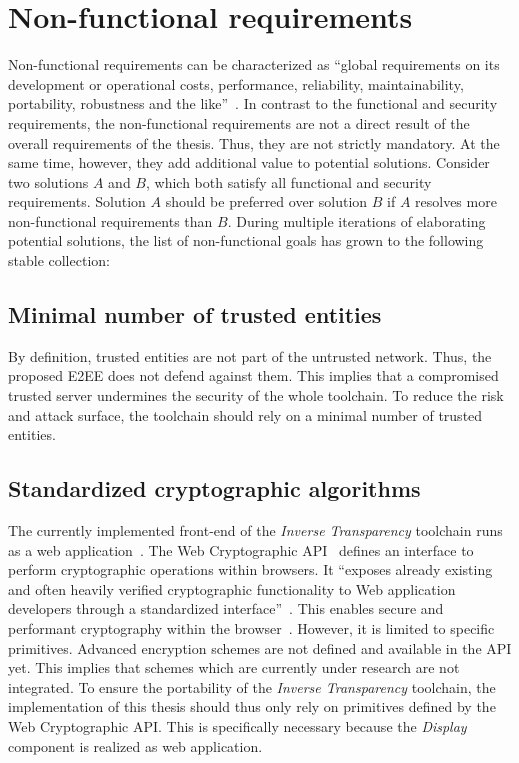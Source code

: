 \documentclass[../main.tex]{subfiles}
\begin{document}
\section{Non-functional requirements}\label{non-functional-requriements}
Non-functional requirements can be characterized as \enquote{global requirements on its development or operational costs, performance, reliability, maintainability, portability, robustness and the like}~\cite[11]{Mylopoulos1992}.
In contrast to the functional and security requirements, the non-functional requirements are not a direct result of the overall requirements of the thesis.
Thus, they are not strictly mandatory.
At the same time, however, they add additional value to potential solutions.
Consider two solutions $A$ and $B$, which both satisfy all functional and security requirements.
Solution $A$ should be preferred over solution $B$ if $A$ resolves more non-functional requirements than $B$.
During multiple iterations of elaborating potential solutions, the list of non-functional goals has grown to the following stable collection:

\subsection{Minimal number of trusted entities}
By definition, trusted entities are not part of the untrusted network. 
Thus, the proposed E2EE does not defend against them.
This implies that a compromised trusted server undermines the security of the whole toolchain.
To reduce the risk and attack surface, the toolchain should rely on a minimal number of trusted entities.

\subsection{Standardized cryptographic algorithms}
The currently implemented front-end of the \emph{Inverse Transparency} toolchain runs as a web application~\cite{Zieglmeier2021}. 
The Web Cryptographic API~\cite{WebCryptoApi2017} defines an interface to perform cryptographic operations within browsers. 
It \enquote{exposes already existing and often heavily verified cryptographic functionality to Web application developers through a standardized interface}~\cite[959]{Halpin2014}.
This enables secure and performant cryptography within the browser~\cite{Halpin2014}.
However, it is limited to specific primitives. 
Advanced encryption schemes are not defined and available in the API yet.
This implies that schemes which are currently under research are not integrated.
To ensure the portability of the \emph{Inverse Transparency} toolchain, the implementation of this thesis should thus only rely on primitives defined by the Web Cryptographic API.
This is specifically necessary because the \emph{Display} component is realized as web application.
\end{document}
